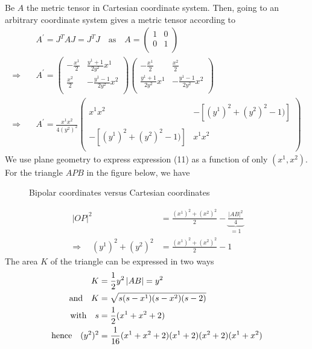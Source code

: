 \newpage
Be $A$ the metric tensor in Cartesian coordinate system. Then, going to an arbitrary coordinate system gives a metric tensor according to  
\begin{align}
\ & A^{'} = J^TAJ =J^TJ \quad \text{as}\quad A = \begin{pmatrix}
1 &0 \\
0& 1 \\
\end{pmatrix}\\
\Rightarrow\quad & A^{'} = \begin{pmatrix}
-\frac{x^1}{2} & \frac{y^1+1}{2y^2}x^1 \\
\frac{x^2}{2} & -\frac{y^1-1}{2y^2}x^2 \\
\end{pmatrix}\begin{pmatrix}
-\frac{x^1}{2} &\frac{x^2}{2}  \\
\frac{y^1+1}{2y^2}x^1 & -\frac{y^1-1}{2y^2}x^2 \\
\end{pmatrix}\\
\Rightarrow\quad & A^{'} =\frac{x^1x^2}{4(y^2)^2} \begin{pmatrix}
\ & \\
x^1x^2 &-\left[(y^1)^2 +(y^2)^2-1)\right] \\\\
-\left[(y^1)^2 +(y^2)^2-1)\right]  &x^1x^2\\
\ & 
\end{pmatrix}
\end{align}
We use plane geometry to express expression (11) as  a function of only $(x^1,x^2)$. For the triangle $APB$ in the figure below, we have
\begin{figure}[h]

\caption{Bipolar coordinates versus Cartesian coordinates}
\label{fig:fig_p79_260_b}
\end{figure}
\begin{align*}
\ \left |  OP \right |^2 &= \frac{(x^1)^2+(x^2)^2}{2} - \underbrace{\frac{\left | AB \right|^2}{4}}_{=1}\\
\Rightarrow\quad (y^1)^2 +(y^2)^2 &= \frac{(x^1)^2+(x^2)^2}{2} - 1
\end{align*}
The area $K$ of the triangle can be expressed in two ways
\begin{align*}
\ K &= \frac{1}{2} y^2\left | AB \right| = y^2\\
\text{and} \quad K &= \sqrt{s(s-x^1)(s-x^2)(s-2)}\\
\text{with}\quad s &= \frac{1}{2} (x^1+x^2+2)\\
\text{hence}\quad (y^2)^2 &= \frac{1}{16}(x^1+x^2+2)(x^1+2)(x^2+2)(x^1+x^2)
\end{align*}
